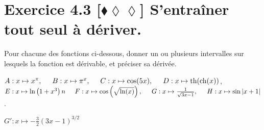 \documentclass[10pt]{article}
\DeclareMathOperator{\ch}{ch}
\DeclareMathOperator{\tah}{th}
\begin{document}
\section*{Exercice 4.3 [$\blacklozenge\lozenge\lozenge$] S'entraîner tout seul à dériver.}
\begin{tcolorbox}[enhanced, width=7in, center, size=fbox, fontupper=\large, drop shadow southwest]
    Pour chacune des fonctions ci-dessous, donner un ou plusieurs intervalles sur lesquels la fonction est dérivable, et préciser sa dérivée.
    \begin{center}
        $A:x\mapsto x^\pi,\hspace{0.5cm}B:x\mapsto\pi^x,\hspace{0.5cm}C:x\mapsto\cos(5x),\hspace{0.5cm}D:x\mapsto\tah(\ch(x))$,\\
        $E:x\mapsto\ln\left(1+x^3\right)n\hspace{0.5cm}F:x\mapsto\cos\left(\sqrt{\ln(x)}\right),\hspace{0.5cm}G:x\mapsto\frac{1}{\sqrt{3x-1}},\hspace{0.5cm}H:x\mapsto\sin|x+1|$.
    \end{center}
    
    $G':x\mapsto-\frac{3}{2}(3x-1)^{3/2}$
    

\end{tcolorbox}
\end{document}
